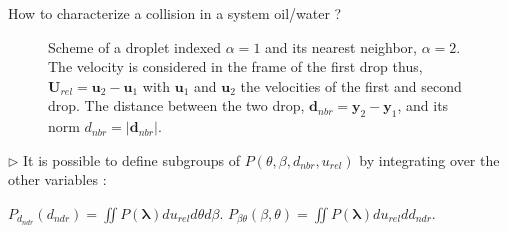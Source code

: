 \documentclass{sintefbeamer}
\begin{document}
\begin{frame}{How to characterize a collision in a system oil/water ?}
\begin{figure}[h!]
  \centering
  \caption{Scheme of a droplet indexed $\alpha =1$ and its nearest neighbor, $\alpha = 2$. The velocity is considered in the frame of the first drop thus, $\bm{U}_{rel} =  \bm{u}_2-\bm{u}_1$ with $\bm{u}_1$ and $\bm{u}_2$ the velocities of the first and second drop. The distance between the two drop, $\bm{d}_{nbr} = \bm{y}_2 -\bm{y}_1$, and its norm $d_{nbr} = |\bm{d}_{nbr}|$. }
\end{figure}
$\triangleright$  It is possible to define subgroups of $P(\theta,\beta,d_{nbr},u_{rel})$ by integrating over the other variables :

$P_{d_{ndr}}(d_{ndr}) = \iint P(\bm{\lambda}) du_{rel}d\theta d\beta.$\hfill
 $P_{\beta\theta}(\beta,\theta) = \iint P(\bm{\lambda}) du_{rel} dd_{ndr}.$
\end{frame}
\end{document}
